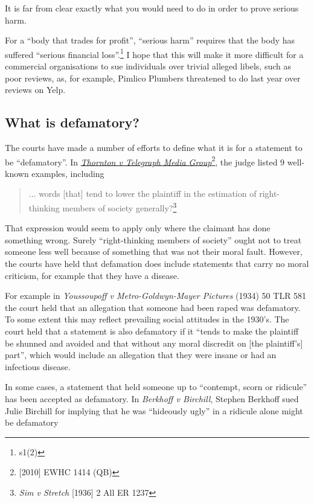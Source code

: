 \documentclass[]{article}
\begin{document}
It is far from clear exactly what you would need to do in order to prove serious harm.

For a ``body that trades for profit'', ``serious harm'' requires that the body has suffered ``serious financial loss''.\footnote{s1(2)} I hope that this will make it more difficult for a commercial organisations to sue individuals over trivial alleged libels, such as poor reviews, as, for example, Pimlico Plumbers threatened to do last year over reviews on Yelp.


\subsection{What is defamatory?}

The courts have made a number of efforts to define what it is for a statement to be ``defamatory''. In \href{http://www.bailii.org/ew/cases/EWHC/QB/2010/1414.html}{\it Thornton v Telegraph Media Group}\footnote{[2010] EWHC 1414 (QB)}, the judge listed 9 well-known examples, including

\begin{quote}
... words [that] tend to lower the plaintiff in the estimation of right-thinking members of society generally?\footnote{{\it Sim v Stretch} [1936] 2 All ER 1237}
\end{quote}

That expression would seem to apply only where the claimant has done something wrong. Surely ``right-thinking members of society'' ought not to treat someone less well because of something that was not their moral fault. However, the courts have held that defamation does include statements that carry no moral criticism, for example that they have a disease.

For example in {\it Youssoupoff v Metro-Goldwyn-Mayer Pictures} (1934) 50 TLR 581 the court held that an allegation that someone had been raped was defamatory. To some extent this may reflect prevailing social attitudes in the 1930's. The court held that a statement is also defamatory if it ``tends to make the plaintiff be shunned and avoided and that without any moral discredit on [the plaintiff's] part'', which would include an allegation that they were insane or had an infectious disease.

In some cases, a statement that held someone up to ``contempt, scorn or ridicule'' has been accepted as defamatory. In {\it Berkhoff v Birchill}, Stephen Berkhoff sued Julie Birchill for implying that he was ``hideously ugly'' in a  ridicule alone might be defamatory
\end{document}
